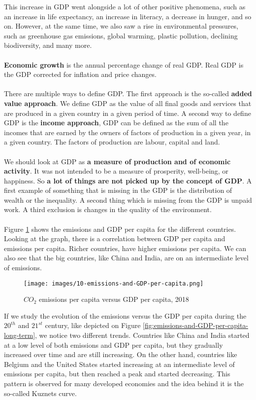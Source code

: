 \documentclass[../summary.tex]{subfiles}
\begin{document}
	\newpage
	This increase in GDP went alongside a lot of other positive phenomena, such as an increase in life expectancy, an increase in literacy, a decrease in hunger, and so on. However, at the same time, we also saw a rise in environmental pressures, such as greenhouse gas emissions, global warming, plastic pollution, declining biodiversity, and many more. 
	\\\\
	\textbf{Economic growth} is the annual percentage change of real GDP. Real GDP is the GDP corrected for inflation and price changes.
	\\\\
	There are multiple ways to define GDP. The first approach is the so-called \textbf{added value approach}. We define GDP as the value of all final goods and services that are produced in a given country in a given period of time. A second way to define GDP is the \textbf{income approach}, GDP can be defined as the sum of all the incomes that are earned by the owners of factors of production in a given year, in a given country. The factors of production are labour, capital and land.
	\\\\
	We should look at GDP as \textbf{a measure of production and of economic activity}. It was not intended to be a measure of prosperity, well-being, or happiness. So \textbf{a lot of things are not picked up by the concept of GDP}. A first example of something that is missing in the GDP is the distribution of wealth or the inequality. A second thing which is missing from the GDP is unpaid work. A third exclusion is changes in the quality of the environment.
	\\\\	
	Figure \ref{fig:emissions-and-GDP-per-capita} shows the emissions and GDP per capita for the different countries. Looking at the graph, there is a correlation between GDP per capita and emissions per capita. Richer countries, have higher emissions per capita. We can also see that the big countries, like China and India, are on an intermediate level of emissions. 
	
	\begin{figure}[htbp]
		\centering
		\texttt{[image: images/10-emissions-and-GDP-per-capita.png]}
		\caption{$CO_{2}$ emissions per capita versus GDP per capita, 2018}
		\label{fig:emissions-and-GDP-per-capita}
	\end{figure}

	If we study the evolution of the emissions versus the GDP per capita during the $20^{th}$ and $21^{st}$ century, like depicted on Figure \ref{fig:emissions-and-GDP-per-capita-long-term}, we notice two different trends. Countries like China and India started at a low level of both emissions and GDP per capita, but they gradually increased over time and are still increasing. On the other hand, countries like Belgium and the United States started increasing at an intermediate level of emissions per capita, but then reached a peak and started decreasing. This pattern is observed for many developed economies and the idea behind it is the so-called Kuznets curve.
	
\end{document}

